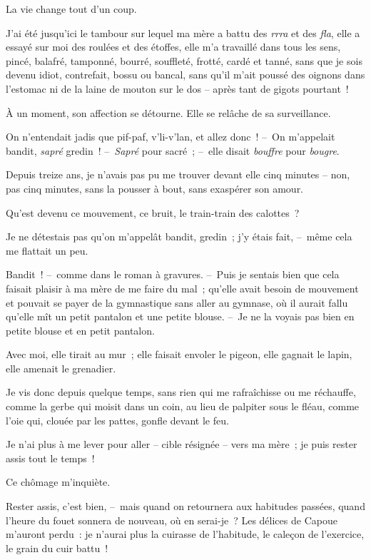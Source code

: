 \documentclass[french,twoside]{book} %
\def\mednobreak{\ifdim\lastskip<\medskipamount
  \removelastskip\nopagebreak\medskip\fi}
\newcommand{\labelblock}[1]{\medbreak{\noindent\color{rubric}\bfseries #1}\par\mednobreak}
\begin{document}
\labelblock{CHÔMAGE}

\noindent La vie change tout d’un coup.\par
J’ai été jusqu’ici le tambour sur lequel ma mère a battu des \emph{rrra} et des \emph{fla}, elle a essayé sur moi des roulées et des étoffes, elle m’a travaillé dans tous les sens, pincé, balafré, tamponné, bourré, souffleté, frotté, cardé et tanné, sans que je sois devenu idiot, contrefait, bossu ou bancal, sans qu’il m’ait poussé des oignons dans l’estomac ni de la laine de mouton sur le dos – après tant de gigots pourtant !\par
À un moment, son affection se détourne. Elle se relâche de sa surveillance.\par
On n’entendait jadis que pif-paf, v’li-v’lan, et allez donc ! – On m’appelait bandit, \emph{sapré} gredin ! – \emph{Sapré} pour sacré ; – elle disait\emph{ bouffre} pour \emph{bougre}.\par
Depuis treize ans, je n’avais pas pu me trouver devant elle cinq minutes – non, pas cinq minutes, sans la pousser à bout, sans exaspérer son amour.\par
Qu’est devenu ce mouvement, ce bruit, le train-train des calottes ?\par
Je ne détestais pas qu’on m’appelât bandit, gredin ; j’y étais fait, – même cela me flattait un peu.\par
Bandit ! – comme dans le roman à gravures. – Puis je sentais bien que cela faisait plaisir à ma mère de me faire du mal ; qu’elle avait besoin de mouvement et pouvait se payer de la gymnastique sans aller au gymnase, où il aurait fallu qu’elle mît un petit pantalon et une petite blouse. – Je ne la voyais pas bien en petite blouse et en petit pantalon.\par
Avec moi, elle tirait au mur ; elle faisait envoler le pigeon, elle gagnait le lapin, elle amenait le grenadier.\par
\bigbreak
\noindent Je vis donc depuis quelque temps, sans rien qui me rafraîchisse ou me réchauffe, comme la gerbe qui moisit dans un coin, au lieu de palpiter sous le fléau, comme l’oie qui, clouée par les pattes, gonfle devant le feu.\par
Je n’ai plus à me lever pour aller – cible résignée – vers ma mère ; je puis rester assis tout le temps !\par
Ce chômage m’inquiète.\par
Rester assis, c’est bien, – mais quand on retournera aux habitudes passées, quand l’heure du fouet sonnera de nouveau, où en serai-je ? Les délices de Capoue m’auront perdu : je n’aurai plus la cuirasse de l’habitude, le caleçon de l’exercice, le grain du cuir battu !\par
\end{document}
